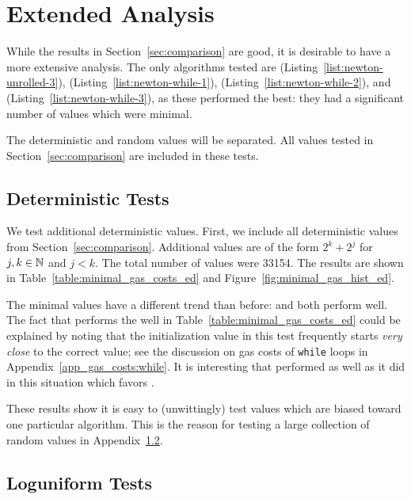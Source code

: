 \section{Extended Analysis}
\label{app:extended}

While the results in Section~\ref{sec:comparison} are good,
it is desirable to have a more extensive analysis.
The only algorithms tested are
\UnrolledThree{} (Listing~\ref{list:newton-unrolled-3}),
\WhileOne{} (Listing~\ref{list:newton-while-1}),
\WhileTwo{} (Listing~\ref{list:newton-while-2}), and
\WhileThree{} (Listing~\ref{list:newton-while-3}),
as these performed the best:
they had a significant number of values which were minimal.

The deterministic and random values will be separated.
All values tested in Section~\ref{sec:comparison}
are included in these tests.

\subsection{Deterministic Tests}
\label{app:deterministic}

We test additional deterministic values.
First, we include all deterministic values from Section~\ref{sec:comparison}.
Additional values are of the form $2^{k} + 2^{j}$ for $j,k\in\mathbb{N}$ and $j < k$.
The total number of values were 33154.
The results are shown in Table~\ref{table:minimal_gas_costs_ed}
and Figure~\ref{fig:minimal_gas_hist_ed}.

The minimal values have a different trend than before:
\UnrolledThree{} and \WhileOne{} both perform well.
The fact that \WhileOne{} performs the well in
Table~\ref{table:minimal_gas_costs_ed}
could be explained by noting that the initialization value in this test
frequently starts \emph{very close} to the correct value;
see the discussion on gas costs of \texttt{while} loops
in Appendix~\ref{app_gas_costs:while}.
It is interesting that \UnrolledThree{} performed
as well as it did in this situation which favors \WhileOne{}.

These results show it is easy to (unwittingly)
test values which are biased toward one particular algorithm.
This is the reason for testing a large collection
of random values in Appendix~\ref{app:loguniform}.




\subsection{Loguniform Tests}
\label{app:loguniform}

